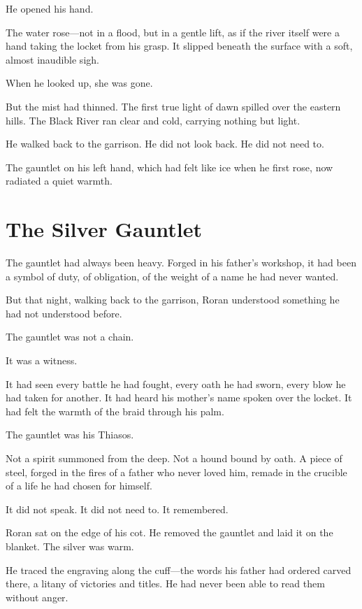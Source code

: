 He opened his hand.

The water rose—not in a flood, but in a gentle lift, as if the river itself were a hand taking the locket from his grasp. It slipped beneath the surface with a soft, almost inaudible sigh.

When he looked up, she was gone.

But the mist had thinned. The first true light of dawn spilled over the eastern hills. The Black River ran clear and cold, carrying nothing but light.

\vspace{1em}

He walked back to the garrison. He did not look back. He did not need to.

The gauntlet on his left hand, which had felt like ice when he first rose, now radiated a quiet warmth.

\section*{The Silver Gauntlet}

The gauntlet had always been heavy. Forged in his father's workshop, it had been a symbol of duty, of obligation, of the weight of a name he had never wanted.

But that night, walking back to the garrison, Roran understood something he had not understood before.

The gauntlet was not a chain.

It was a witness.

It had seen every battle he had fought, every oath he had sworn, every blow he had taken for another. It had heard his mother's name spoken over the locket. It had felt the warmth of the braid through his palm.

The gauntlet was his Thiasos.

Not a spirit summoned from the deep. Not a hound bound by oath. A piece of steel, forged in the fires of a father who never loved him, remade in the crucible of a life he had chosen for himself.

It did not speak. It did not need to. It remembered.

\vspace{1em}

Roran sat on the edge of his cot. He removed the gauntlet and laid it on the blanket. The silver was warm.

He traced the engraving along the cuff—the words his father had ordered carved there, a litany of victories and titles. He had never been able to read them without anger.

